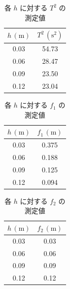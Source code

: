 \documentclass{jlreq}
\begin{document}
\begin{table}[htbp]
  \centering
  \caption{各 $h$ に対する $T^2$ の測定値}
  \renewcommand{\arraystretch}{1.2} %
  \setlength{\tabcolsep}{6pt}       %
  \begin{tabular}{|c|c|}
    \hline
    \textbf{$h\,(\mathrm{m})$} & \textbf{$T^2\,(\mathrm{s^2})$} \\ \hline
    0.03 & 54.73 \\ \hline
    0.06 & 28.47 \\ \hline
    0.09 & 23.50 \\ \hline
    0.12 & 23.04 \\ \hline
  \end{tabular}
  \label{tab:T2_values}
\end{table}









\begin{table}[htbp]
  \centering
  \caption{各 $h$ に対する $f_1$ の測定値}
  \renewcommand{\arraystretch}{1.2} %
  \setlength{\tabcolsep}{6pt}       %
  \begin{tabular}{|c|c|}
    \hline
    \textbf{$h\,(\mathrm{m})$} & \textbf{$f_1\,(\mathrm{m})$} \\ \hline
    0.03 & 0.375 \\ \hline
    0.06 & 0.188 \\ \hline
    0.09 & 0.125 \\ \hline
    0.12 & 0.094 \\ \hline
  \end{tabular}
  \label{tab:f1_values}
\end{table}







\begin{table}[htbp]
  \centering
  \caption{各 $h$ に対する $f_2$ の測定値}
  \renewcommand{\arraystretch}{1.2} %
  \setlength{\tabcolsep}{6pt}       %
  \begin{tabular}{|c|c|}
    \hline
    \textbf{$h\,(\mathrm{m})$} & \textbf{$f_2\,(\mathrm{m})$} \\ \hline
    0.03 & 0.03 \\ \hline
    0.06 & 0.06 \\ \hline
    0.09 & 0.09 \\ \hline
    0.12 & 0.12 \\ \hline
  \end{tabular}
  \label{tab:f2_values}
\end{table}
\end{document}
